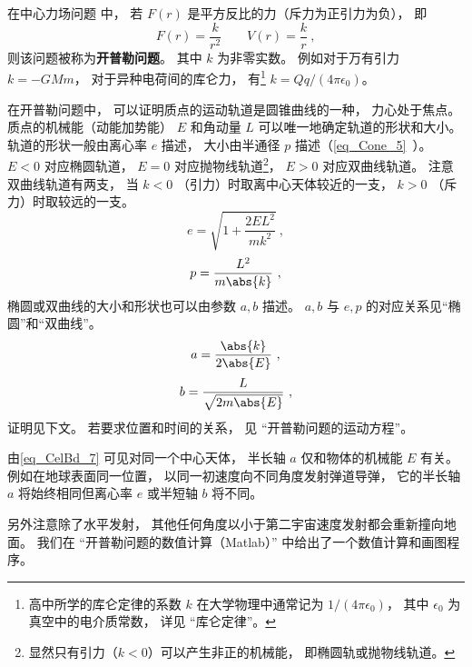 

在中心力场问题 中， 若 $F(r)$ 是平方反比的力（斥力为正引力为负）， 即
\begin{equation}
F(r) = \frac{k}{r^2}  \qquad V(r) = \frac{k}{r}~,
\end{equation}
则该问题被称为\textbf{开普勒问题}。 其中 $k$ 为非零实数。 例如对于万有引力 $k = -GMm$， 对于异种电荷间的库仑力， 有\footnote{高中所学的库仑定律的系数 $k$ 在大学物理中通常记为 $1/(4\pi\epsilon_0)$， 其中 $\epsilon_0$ 为真空中的电介质常数， 详见 “库仑定律”。} $k = Qq/(4\pi\epsilon_0)$。

在开普勒问题中， 可以证明质点的运动轨道是圆锥曲线的一种， 力心处于焦点。 质点的机械能（动能加势能） $E$ 和角动量 $L$ 可以唯一地确定轨道的形状和大小。 轨道的形状一般由离心率 $e$ 描述， 大小由半通径 $p$ 描述（\autoref{eq_Cone_5}~）。 $E < 0$ 对应椭圆轨道， $E = 0$ 对应抛物线轨道\footnote{显然只有引力（$k < 0$）可以产生非正的机械能， 即椭圆轨或抛物线轨道。}， $E > 0$ 对应双曲线轨道。 注意双曲线轨道有两支， 当 $k < 0$ （引力）时取离中心天体较近的一支， $k > 0$ （斥力）时取较远的一支。
\begin{equation}\label{eq_CelBd_2}
e = \sqrt{1 + \frac{2EL^2}{mk^2}}~,
\end{equation}
\begin{equation}\label{eq_CelBd_3}
p = \frac{L^2}{m\abs{k}}~,
\end{equation}
椭圆或双曲线的大小和形状也可以由参数 $a,b$ 描述。 $a,b$ 与 $e,p$ 的对应关系见“椭圆”和“双曲线”。
\begin{equation}\label{eq_CelBd_7}
a = \frac{\abs{k}}{2\abs{E}}~,
\end{equation}
\begin{equation}\label{eq_CelBd_8}
b = \frac{L}{\sqrt{2m\abs{E}}}~,
\end{equation}
证明见下文。 若要求位置和时间的关系， 见 “开普勒问题的运动方程”。

\begin{example}{}
由\autoref{eq_CelBd_7} 可见对同一个中心天体， 半长轴 $a$ 仅和物体的机械能 $E$ 有关。 例如在地球表面同一位置， 以同一初速度向不同角度发射弹道导弹， 它的半长轴 $a$ 将始终相同但离心率 $e$ 或半短轴 $b$ 将不同。

另外注意除了水平发射， 其他任何角度以小于第二宇宙速度发射都会重新撞向地面。 我们在 “开普勒问题的数值计算（Matlab）” 中给出了一个数值计算和画图程序。
\end{example}

